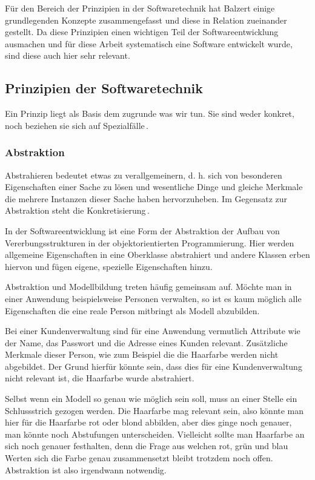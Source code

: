 \documentclass[12pt,oneside,a4paper,parskip]{scrbook}
\begin{document}
Für den Bereich der Prinzipien in der Softwaretechnik hat Balzert einige grundlegenden Konzepte zusammengefasst und diese in Relation zueinander gestellt. Da diese Prinzipien einen wichtigen Teil der Softwareentwicklung ausmachen und für diese Arbeit systematisch eine Software entwickelt wurde, sind diese auch hier sehr relevant.

\subsection{Prinzipien der Softwaretechnik}

Ein Prinzip liegt als Basis dem zugrunde was wir tun. Sie sind weder konkret, noch beziehen sie sich auf Spezialfälle\,\cite[S. 25]{balzert2009a}. 

\subsubsection{Abstraktion}

Abstrahieren bedeutet etwas zu verallgemeinern, d. h. sich von besonderen Eigenschaften einer Sache zu lösen und wesentliche Dinge und gleiche Merkmale die mehrere Instanzen dieser Sache haben hervorzuheben. Im Gegensatz zur Abstraktion steht die Konkretisierung\,\cite[S. 26]{balzert2009a}.

In der Softwareentwicklung ist eine Form der Abstraktion der Aufbau von Vererbungsstrukturen in der objektorientierten Programmierung. Hier werden allgemeine Eigenschaften in eine Oberklasse abstrahiert und andere Klassen erben hiervon und fügen eigene, spezielle Eigenschaften hinzu.

Abstraktion und Modellbildung treten häufig gemeinsam auf. Möchte man in einer Anwendung beispielsweise Personen verwalten, so ist es kaum möglich alle Eigenschaften die eine reale Person mitbringt als Modell abzubilden. 

Bei einer Kundenverwaltung sind für eine Anwendung vermutlich Attribute wie der Name, das Passwort und die Adresse eines Kunden relevant. Zusätzliche Merkmale dieser Person, wie zum Beispiel die die Haarfarbe werden nicht abgebildet. Der Grund hierfür könnte sein, dass dies für eine Kundenverwaltung nicht relevant ist, die Haarfarbe wurde abstrahiert.

Selbst wenn ein Modell so genau wie möglich sein soll, muss an einer Stelle ein Schlussstrich gezogen werden. Die Haarfarbe mag relevant sein, also könnte man hier für die Haarfarbe rot oder blond abbilden, aber dies ginge noch genauer, man könnte noch Abstufungen unterscheiden. Vielleicht sollte man Haarfarbe an sich noch genauer festhalten, denn die Frage aus welchen rot, grün und blau Werten sich die Farbe genau zusammensetzt bleibt trotzdem noch offen. Abstraktion ist also irgendwann notwendig.
\end{document}
